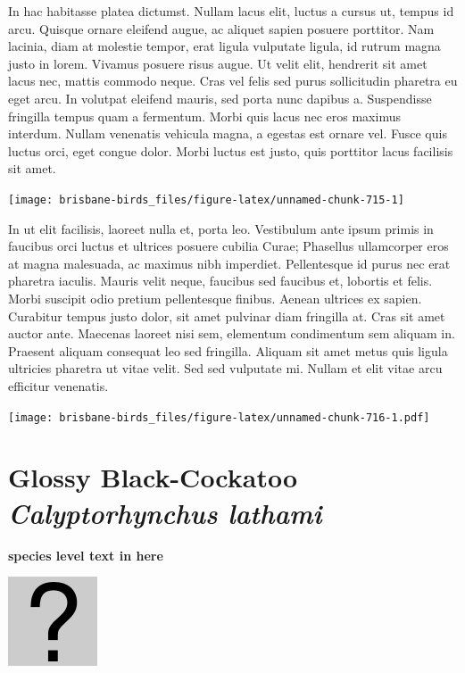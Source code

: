 \documentclass[]{book}
\let\origfigure\figure
\let\endorigfigure\endfigure
\renewenvironment{figure}[1][2] {
  \expandafter\origfigure\expandafter[H]
} {
  \endorigfigure
}
\begin{document}
In hac habitasse platea dictumst. Nullam lacus elit, luctus a cursus ut,
tempus id arcu. Quisque ornare eleifend augue, ac aliquet sapien posuere
porttitor. Nam lacinia, diam at molestie tempor, erat ligula vulputate
ligula, id rutrum magna justo in lorem. Vivamus posuere risus augue. Ut
velit elit, hendrerit sit amet lacus nec, mattis commodo neque. Cras vel
felis sed purus sollicitudin pharetra eu eget arcu. In volutpat eleifend
mauris, sed porta nunc dapibus a. Suspendisse fringilla tempus quam a
fermentum. Morbi quis lacus nec eros maximus interdum. Nullam venenatis
vehicula magna, a egestas est ornare vel. Fusce quis luctus orci, eget
congue dolor. Morbi luctus est justo, quis porttitor lacus facilisis sit
amet.

\begin{figure}
\texttt{[image: brisbane-birds\_files/figure-latex/unnamed-chunk-715-1]} \caption{insert figure caption}\label{fig:unnamed-chunk-715}
\end{figure}

In ut elit facilisis, laoreet nulla et, porta leo. Vestibulum ante ipsum
primis in faucibus orci luctus et ultrices posuere cubilia Curae;
Phasellus ullamcorper eros at magna malesuada, ac maximus nibh
imperdiet. Pellentesque id purus nec erat pharetra iaculis. Mauris velit
neque, faucibus sed faucibus et, lobortis et felis. Morbi suscipit odio
pretium pellentesque finibus. Aenean ultrices ex sapien. Curabitur
tempus justo dolor, sit amet pulvinar diam fringilla at. Cras sit amet
auctor ante. Maecenas laoreet nisi sem, elementum condimentum sem
aliquam in. Praesent aliquam consequat leo sed fringilla. Aliquam sit
amet metus quis ligula ultricies pharetra ut vitae velit. Sed sed
vulputate mi. Nullam et elit vitae arcu efficitur venenatis.

\begin{figure}
\centering
\texttt{[image: brisbane-birds\_files/figure-latex/unnamed-chunk-716-1.pdf]}
\caption{\label{fig:unnamed-chunk-716}insert figure caption}
\end{figure}

\section{\texorpdfstring{Glossy Black-Cockatoo \emph{Calyptorhynchus
lathami}}{Glossy Black-Cockatoo Calyptorhynchus lathami}}\label{glossy-black-cockatoo-calyptorhynchus-lathami}

\textbf{species level text in here}

\begin{figure}
\centering
\includegraphics{assets/missing.png}
\caption{No image for species}
\end{figure}
\end{document}
